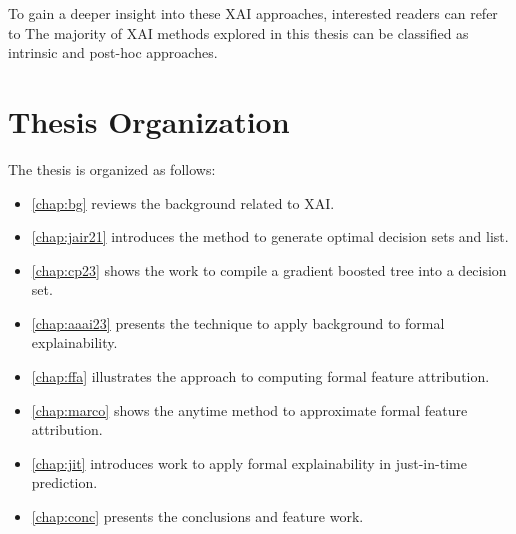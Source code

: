 To gain a deeper insight into these XAI approaches, interested readers can refer to
%
The majority of XAI methods explored in this thesis can be classified as intrinsic
and post-hoc approaches.





\section{Thesis Organization} \label{sec:structure}
The thesis is organized as follows:
\begin{itemize}
	\item \autoref{chap:bg} reviews the background related to XAI.
	\item \autoref{chap:jair21} introduces the method to generate optimal decision sets and list.
	\item \autoref{chap:cp23} shows the work to compile a gradient boosted tree into a
		decision set.
	\item \autoref{chap:aaai23} presents the technique to apply background to formal
		explainability.
	\item \autoref{chap:ffa}  illustrates the approach to computing formal feature attribution.
	\item \autoref{chap:marco}  shows the anytime method to approximate formal feature
		attribution.
	\item \autoref{chap:jit} introduces work to apply formal explainability in just-in-time
		prediction.
	\item \autoref{chap:conc} presents the conclusions and feature work.
\end{itemize}

